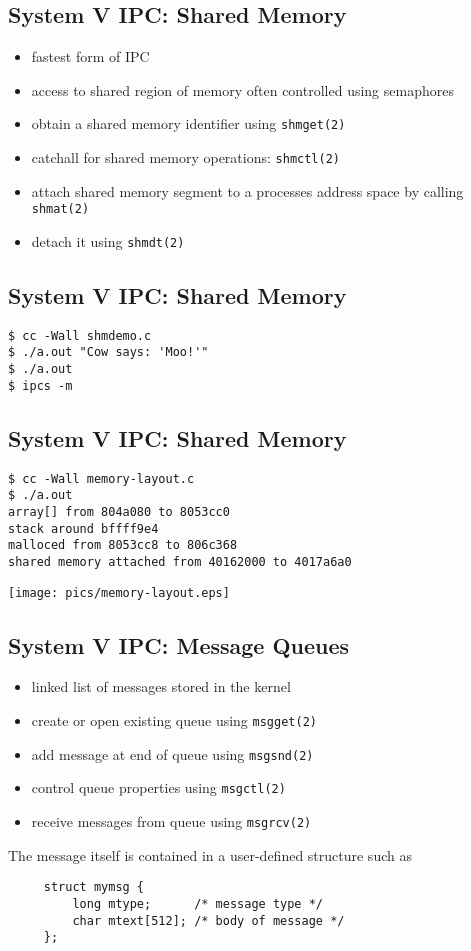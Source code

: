 \documentclass[xga]{xdvislides}
\begin{document}
\subsection{System V IPC: Shared Memory}
\begin{itemize}
	\item fastest form of IPC
	\item access to shared region of memory often controlled using
		semaphores
	\item obtain a shared memory identifier using {\tt shmget(2)}
	\item catchall for shared memory operations: {\tt shmctl(2)}
	\item attach shared memory segment to a processes address space by
		calling {\tt shmat(2)}
	\item detach it using {\tt shmdt(2)}
\end{itemize}

\subsection{System V IPC: Shared Memory}
\begin{verbatim}
$ cc -Wall shmdemo.c
$ ./a.out "Cow says: 'Moo!'"
$ ./a.out
$ ipcs -m
\end{verbatim}

\subsection{System V IPC: Shared Memory}
\begin{verbatim}
$ cc -Wall memory-layout.c
$ ./a.out
array[] from 804a080 to 8053cc0
stack around bffff9e4
malloced from 8053cc8 to 806c368
shared memory attached from 40162000 to 4017a6a0
\end{verbatim}
\begin{center}
	\texttt{[image: pics/memory-layout.eps]}
\end{center}

\subsection{System V IPC: Message Queues}
\begin{itemize}
	\item linked list of messages stored in the kernel
	\item create or open existing queue using {\tt msgget(2)}
	\item add message at end of queue using {\tt msgsnd(2)}
	\item control queue properties using {\tt msgctl(2)}
	\item receive messages from queue using {\tt msgrcv(2)}
\end{itemize}
\vspace{.5in}
The message itself is contained in a user-defined structure such as
\begin{verbatim}
     struct mymsg {
         long mtype;      /* message type */
         char mtext[512]; /* body of message */
     };
\end{verbatim}
\end{document}
